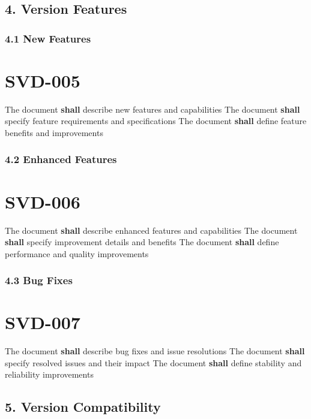 \subsection{4. Version Features}

\subsubsection{4.1 New Features}

\section{SVD-005}\label{SVD-005}

The document \textbf{shall} describe new features and capabilities
The document \textbf{shall} specify feature requirements and specifications
The document \textbf{shall} define feature benefits and improvements

\subsubsection{4.2 Enhanced Features}

\section{SVD-006}\label{SVD-006}

The document \textbf{shall} describe enhanced features and capabilities
The document \textbf{shall} specify improvement details and benefits
The document \textbf{shall} define performance and quality improvements

\subsubsection{4.3 Bug Fixes}

\section{SVD-007}\label{SVD-007}

The document \textbf{shall} describe bug fixes and issue resolutions
The document \textbf{shall} specify resolved issues and their impact
The document \textbf{shall} define stability and reliability improvements

\subsection{5. Version Compatibility}


